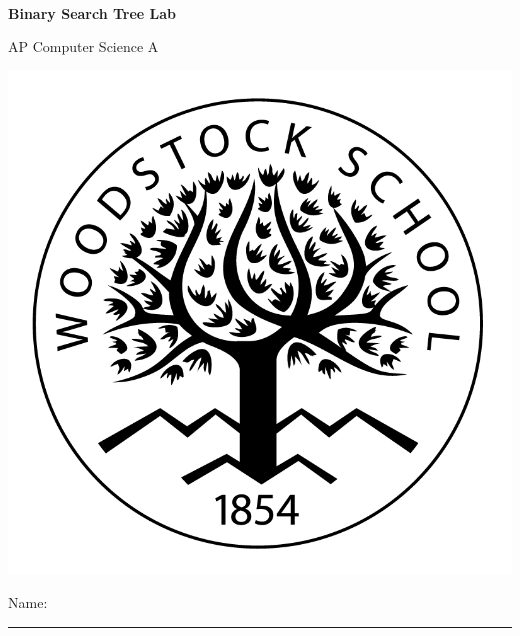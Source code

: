 
\usepackage{pst-tree}
\usepackage{auto-pst-pdf} %

\def\LabCourse{AP Computer Science A}
\def\LabNumber{08}
\def\LabTitle{Binary Search Tree Lab}

\newcommand{\ceil}[1]{\left\lceil #1 \right\rceil}

\newcommand\QFilledBox[2]{
\stepcounter{QuestionCounter}
	\colorbox{black!10}{\parbox{0.9875\textwidth}{
	  \raggedright
	  \textbf{Question \#\theQuestionCounter:} #1
	}}

	\colorbox{black!5}{\parbox{0.9875\textwidth}{
		\raggedright
		#2
	}}
}


	\begin{coverpages}
		\ \\[2cm]
		\begin{center}
			\huge
			\textbf{\LabTitle}

			\Large
			\LabCourse
		\end{center}

		\vspace{1.5cm}

		\begin{center}
			\includegraphics[scale=0.45]{graphics/logo_black}

			\vspace{2.5cm}

			\Large
			Name: \rule{11.5cm}{0.1pt}
		\end{center}
	\end{coverpages}

